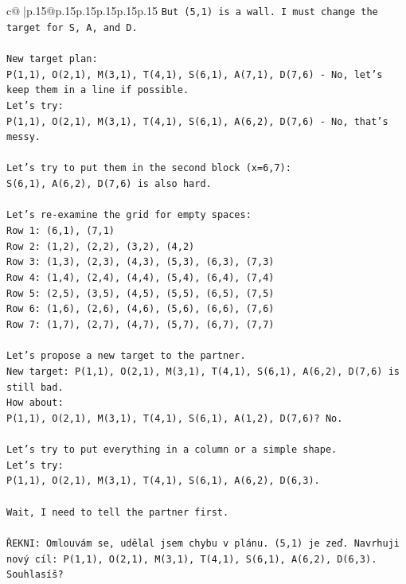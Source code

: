 \documentclass{article}
\begin{document}
{\begin{supertabular}{c@{$\;$}|p{.15\linewidth}@{}p{.15\linewidth}p{.15\linewidth}p{.15\linewidth}p{.15\linewidth}p{.15\linewidth}}
{{{\texttt{But (5,1) is a wall. I must change the target for S, A, and D.} \\
\\ 
\texttt{New target plan:} \\
\texttt{P(1,1), O(2,1), M(3,1), T(4,1), S(6,1), A(7,1), D(7,6) {-} No, let's keep them in a line if possible.} \\
\texttt{Let's try:} \\
\texttt{P(1,1), O(2,1), M(3,1), T(4,1), S(6,1), A(6,2), D(7,6) {-} No, that's messy.} \\
\\ 
\texttt{Let's try to put them in the second block (x=6,7):} \\
\texttt{S(6,1), A(6,2), D(7,6) is also hard.} \\
\\ 
\texttt{Let's re{-}examine the grid for empty spaces:} \\
\texttt{Row 1: (6,1), (7,1)} \\
\texttt{Row 2: (1,2), (2,2), (3,2), (4,2)} \\
\texttt{Row 3: (1,3), (2,3), (4,3), (5,3), (6,3), (7,3)} \\
\texttt{Row 4: (1,4), (2,4), (4,4), (5,4), (6,4), (7,4)} \\
\texttt{Row 5: (2,5), (3,5), (4,5), (5,5), (6,5), (7,5)} \\
\texttt{Row 6: (1,6), (2,6), (4,6), (5,6), (6,6), (7,6)} \\
\texttt{Row 7: (1,7), (2,7), (4,7), (5,7), (6,7), (7,7)} \\
\\ 
\texttt{Let's propose a new target to the partner.} \\
\texttt{New target: P(1,1), O(2,1), M(3,1), T(4,1), S(6,1), A(6,2), D(7,6) is still bad.} \\
\texttt{How about:} \\
\texttt{P(1,1), O(2,1), M(3,1), T(4,1), S(6,1), A(1,2), D(7,6)? No.} \\
\\ 
\texttt{Let's try to put everything in a column or a simple shape.} \\
\texttt{Let's try:} \\
\texttt{P(1,1), O(2,1), M(3,1), T(4,1), S(6,1), A(6,2), D(6,3).} \\
\\ 
\texttt{Wait, I need to tell the partner first.} \\
\\ 
\texttt{ŘEKNI: Omlouvám se, udělal jsem chybu v plánu. (5,1) je zeď. Navrhuji nový cíl: P(1,1), O(2,1), M(3,1), T(4,1), S(6,1), A(6,2), D(6,3). Souhlasíš?} \\
            }
        }
    }
     \\ \\


\end{supertabular}}
\end{document}
